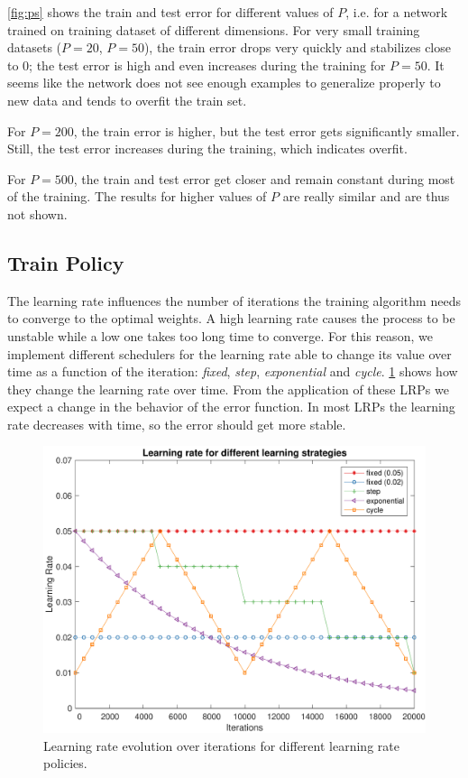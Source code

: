 \cref{fig:ps} shows the train and test error for different values of $P$, i.e. for a network trained on training dataset of different dimensions.
For very small training datasets ($P = 20$, $P = 50$), the train error drops very quickly and stabilizes close to $0$;
the test error is high and even increases during the training for $P = 50$.
It seems like the network does not see enough examples to generalize properly to new data and tends to overfit the train set.

For $P = 200$, the train error is higher, but the test error gets significantly smaller.
Still, the test error increases during the training, which indicates overfit.

For $P = 500$, the train and test error get closer and remain constant during most of the training.
The results for higher values of $P$ are really similar and are thus not shown.

\subsection{Train Policy}
The learning rate influences the number of iterations the training algorithm needs to converge to the optimal weights.
A high learning rate causes the process to be unstable while a low one takes too long time to converge.
For this reason, we implement different schedulers for the learning rate able to change its value over time as a function of the iteration: \textit{fixed}, \textit{step}, \textit{exponential} and \textit{cycle}.
\cref{fig:learning_rates_policies} shows how they change the learning rate over time.
From the application of these \acp{LRP} we expect a change in the behavior of the error function.
In most \acp{LRP} the learning rate decreases with time, so the error should get more stable.

\begin{figure}
	\centering
	\includegraphics[width=\columnwidth]{figures/learning_rates}
	\caption{Learning rate evolution over iterations for different learning rate policies.}
	\label{fig:learning_rates_policies}
\end{figure}

